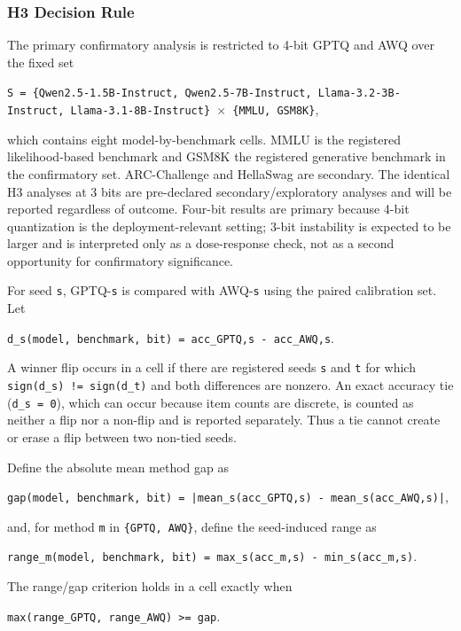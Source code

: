\subsubsection{H3 Decision Rule}
The primary confirmatory analysis is restricted to 4-bit GPTQ and AWQ over the fixed set

\texttt{S = \{Qwen2.5-\allowbreak{}1.5B-\allowbreak{}Instruct, Qwen2.5-\allowbreak{}7B-\allowbreak{}Instruct, Llama-\allowbreak{}3.2-\allowbreak{}3B-\allowbreak{}Instruct, Llama-\allowbreak{}3.1-\allowbreak{}8B-\allowbreak{}Instruct\} $\times$ \{MMLU, GSM8K\}},

which contains eight model-by-benchmark cells. MMLU is the registered likelihood-based benchmark and GSM8K the registered generative benchmark in the confirmatory set. ARC-Challenge and HellaSwag are secondary. The identical H3 analyses at 3 bits are pre-declared secondary/exploratory analyses and will be reported regardless of outcome. Four-bit results are primary because 4-bit quantization is the deployment-relevant setting; 3-bit instability is expected to be larger and is interpreted only as a dose-response check, not as a second opportunity for confirmatory significance.

For seed \texttt{s}, GPTQ-\texttt{s} is compared with AWQ-\texttt{s} using the paired calibration set. Let

\texttt{d\_s(model, benchmark, bit) = acc\_GPTQ,s -\allowbreak{} acc\_AWQ,s}.

A winner flip occurs in a cell if there are registered seeds \texttt{s} and \texttt{t} for which \texttt{sign(d\_s) != sign(d\_t)} and both differences are nonzero. An exact accuracy tie (\texttt{d\_s = 0}), which can occur because item counts are discrete, is counted as neither a flip nor a non-flip and is reported separately. Thus a tie cannot create or erase a flip between two non-tied seeds.

Define the absolute mean method gap as

\texttt{gap(model, benchmark, bit) = |mean\_s(acc\_GPTQ,s) -\allowbreak{} mean\_s(acc\_AWQ,s)|},

and, for method \texttt{m} in \texttt{\{GPTQ, AWQ\}}, define the seed-induced range as

\texttt{range\_m(model, benchmark, bit) = max\_s(acc\_m,s) -\allowbreak{} min\_s(acc\_m,s)}.

The range/gap criterion holds in a cell exactly when

\texttt{max(range\_GPTQ, range\_AWQ) >= gap}.

